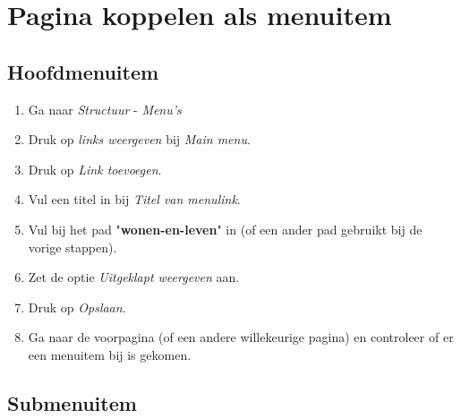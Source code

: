 \section{Pagina koppelen als menuitem}

\subsection{Hoofdmenuitem}

\begin{enumerate}
\item Ga naar \emph{Structuur} - \emph{Menu's}
\begin{center}
\end{center}
\item Druk op \emph{links weergeven} bij \emph{Main menu}.
\item Druk op \emph{Link toevoegen}.
\item Vul een titel in bij \emph{Titel van menulink}.
\item Vul bij het pad "\textbf{wonen-en-leven}" in (of een ander pad gebruikt bij de vorige stappen).
\item Zet de optie \emph{Uitgeklapt weergeven} aan.
\item Druk op \emph{Opslaan}.
\item Ga naar de voorpagina (of een andere willekeurige pagina) en controleer of er een menuitem bij is gekomen.
\end{enumerate}

\subsection{Submenuitem}

